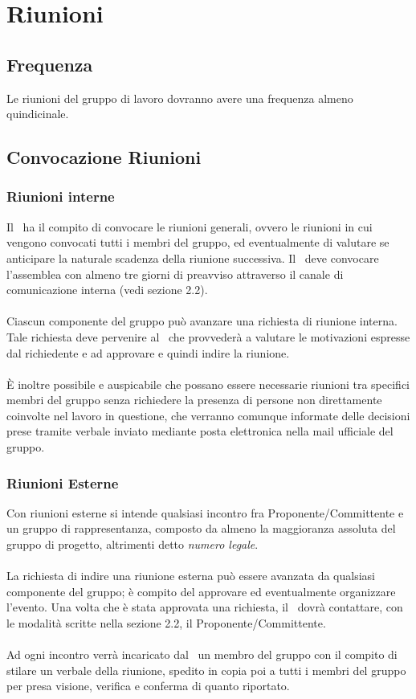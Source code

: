\section{Riunioni}
\subsection{Frequenza}
Le riunioni del gruppo di lavoro dovranno avere una frequenza almeno quindicinale.
\subsection{Convocazione Riunioni}
\subsubsection{Riunioni interne}
Il \ruoloResponsabile\ ha il compito di convocare le riunioni generali, ovvero le riunioni in cui vengono convocati tutti i membri del gruppo, ed eventualmente di valutare se anticipare la naturale scadenza della riunione successiva. Il \ruoloResponsabile\ deve convocare l’assemblea con almeno tre giorni di preavviso attraverso il canale di comunicazione interna (vedi sezione 2.2). \\ \\
Ciascun componente del gruppo può avanzare una richiesta di riunione interna.
Tale richiesta deve pervenire al \ruoloResponsabile\ che provvederà a valutare le motivazioni espresse dal richiedente e ad approvare e quindi indire la riunione. \\ \\
È inoltre possibile e auspicabile che possano essere necessarie riunioni tra specifici membri del gruppo senza richiedere la presenza di persone non direttamente coinvolte nel lavoro in questione, che verranno comunque informate delle decisioni prese tramite verbale inviato mediante posta elettronica nella mail ufficiale del gruppo.

\subsubsection{Riunioni Esterne}
Con riunioni esterne si intende qualsiasi incontro fra Proponente/Committente
e un gruppo di rappresentanza, composto da almeno la maggioranza assoluta del
gruppo di progetto, altrimenti detto \textit{numero legale}.\\
\\
La richiesta di indire una riunione esterna può essere avanzata da qualsiasi componente del gruppo; è compito del \ruoloResponsabile approvare ed eventualmente organizzare l'evento. Una volta che è stata approvata una richiesta, il \ruoloResponsabile\ dovrà contattare, con le modalità scritte nella sezione 2.2, il Proponente/Committente.
\\\\
Ad ogni incontro verrà incaricato dal \ruoloResponsabile\ un membro del gruppo con il compito di stilare un verbale della riunione, spedito in copia poi a tutti i membri del gruppo per presa visione, verifica e conferma di quanto riportato.